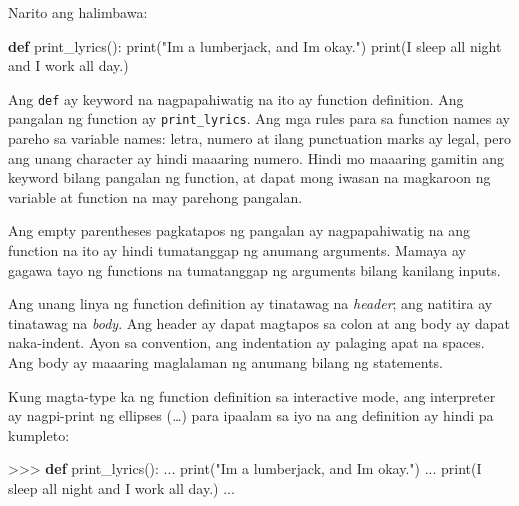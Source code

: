 \documentclass[10pt,]{book}
\newenvironment{Shaded}{}{}
\newcommand{\BuiltInTok}[1]{\textcolor[rgb]{0.00,0.50,0.00}{#1}}
\newcommand{\KeywordTok}[1]{\textcolor[rgb]{0.00,0.44,0.13}{\textbf{#1}}}
\newcommand{\NormalTok}[1]{#1}
\newcommand{\OperatorTok}[1]{\textcolor[rgb]{0.40,0.40,0.40}{#1}}
\newcommand{\StringTok}[1]{\textcolor[rgb]{0.25,0.44,0.63}{#1}}
\begin{document}
  

Narito ang halimbawa:

\begin{Shaded}
\begin{Highlighting}[]
\KeywordTok{def}\NormalTok{ print\_lyrics():}
    \BuiltInTok{print}\NormalTok{(}\StringTok{"I\textquotesingle{}m a lumberjack, and I\textquotesingle{}m okay."}\NormalTok{)}
    \BuiltInTok{print}\NormalTok{(}\StringTok{\textquotesingle{}I sleep all night and I work all day.\textquotesingle{}}\NormalTok{)}
\end{Highlighting}
\end{Shaded}

Ang \texttt{def} ay keyword na nagpapahiwatig na ito ay function
definition. Ang pangalan ng function ay \texttt{print\_lyrics}. Ang mga
rules para sa function names ay pareho sa variable names: letra, numero
at ilang punctuation marks ay legal, pero ang unang character ay hindi
maaaring numero. Hindi mo maaaring gamitin ang keyword bilang pangalan
ng function, at dapat mong iwasan na magkaroon ng variable at function
na may parehong pangalan.

  

Ang empty parentheses pagkatapos ng pangalan ay nagpapahiwatig na ang
function na ito ay hindi tumatanggap ng anumang arguments. Mamaya ay
gagawa tayo ng functions na tumatanggap ng arguments bilang kanilang
inputs.

  
 

Ang unang linya ng function definition ay tinatawag na \emph{header};
ang natitira ay tinatawag na \emph{body}. Ang header ay dapat magtapos
sa colon at ang body ay dapat naka-indent. Ayon sa convention, ang
indentation ay palaging apat na spaces. Ang body ay maaaring maglalaman
ng anumang bilang ng statements.


Kung magta-type ka ng function definition sa interactive mode, ang
interpreter ay nagpi-print ng ellipses (\emph{\ldots{}}) para ipaalam sa
iyo na ang definition ay hindi pa kumpleto:

\begin{Shaded}
\begin{Highlighting}[]
\OperatorTok{\textgreater{}\textgreater{}\textgreater{}} \KeywordTok{def}\NormalTok{ print\_lyrics():}
\NormalTok{...     }\BuiltInTok{print}\NormalTok{(}\StringTok{"I\textquotesingle{}m a lumberjack, and I\textquotesingle{}m okay."}\NormalTok{)}
\NormalTok{...     }\BuiltInTok{print}\NormalTok{(}\StringTok{\textquotesingle{}I sleep all night and I work all day.\textquotesingle{}}\NormalTok{)}
\NormalTok{...}
\end{Highlighting}
\end{Shaded}
\end{document}
